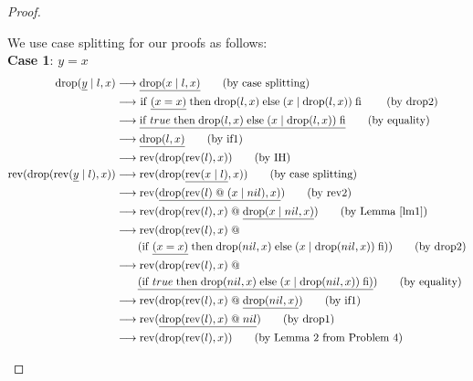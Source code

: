 \documentclass[12pt, a4paper]{article}
\newcommand{\rel}[1]{\mathrel{#1}}
\newcommand{\rmx}[1]{\mathrm{#1}}
\newcommand{\larrow}{\longrightarrow}
\newcommand{\under}{\underline}
\begin{document}
\begin{proof}
\begin{description}
We use case splitting for our proofs as follows:\\
\textbf{Case 1}: $y = x$
\begin{align*}
\rmx{drop}(\under{y} \rel{|} l, x)
	&\larrow \under{\rmx{drop}(x \rel{|} l, x)} \tag{by case splitting} \\
	&\larrow\ \rel{\rmx{if}} \under{(x = x)} \rel{\rmx{then}} \rmx{drop}(l, x) \rel{\rmx{else}} (x \rel{|} \rmx{drop}(l, x)) \rel{\rmx{fi}} \tag{by drop2} \\
	&\larrow \under{\rel{\rmx{if}} true \rel{\rmx{then}} \rmx{drop}(l, x) \rel{\rmx{else}} (x \rel{|} \rmx{drop}(l, x)) \rel{\rmx{fi}}} \tag{by equality} \\
	&\larrow \under{\rmx{drop}(l, x)} \tag{by if1} \\
	&\larrow \rmx{rev}(\rmx{drop}(\rmx{rev}(l), x)) \tag{by IH} \\
\rmx{rev}(\rmx{drop}(\rmx{rev}(\under{y} \rel{|} l), x))
	&\larrow \rmx{rev}(\rmx{drop}(\under{\rmx{rev}(x \rel{|} l)}, x)) \tag{by case splitting} \\
	&\larrow \rmx{rev}(\under{\rmx{drop}(\rmx{rev}(l) \rel{@} (x \rel{|} nil), x)}) \tag{by rev2} \\
	&\larrow \rmx{rev}(\rmx{drop}(\rmx{rev}(l), x) \rel{@} \under{\rmx{drop}(x \rel{|} nil, x)}) \tag{by Lemma~\ref{lm1}} \\
	&\larrow \rmx{rev}(\rmx{drop}(\rmx{rev}(l), x) \rel{@} \\
	&\quad \quad (\rel{\rmx{if}} \under{(x = x)} \rel{\rmx{then}} \rmx{drop}(nil, x) \rel{\rmx{else}} (x \rel{|} \rmx{drop}(nil, x)) \rel{\rmx{fi}})) \tag{by drop2} \\
	&\larrow \rmx{rev}(\rmx{drop}(\rmx{rev}(l), x) \rel{@} \\
	&\quad \quad \under{(\rel{\rmx{if}} true \rel{\rmx{then}} \rmx{drop}(nil, x) \rel{\rmx{else}} (x \rel{|} \rmx{drop}(nil, x)) \rel{\rmx{fi}})}) \tag{by equality} \\
	&\larrow \rmx{rev}(\rmx{drop}(\rmx{rev}(l), x) \rel{@} \under{\rmx{drop}(nil, x)}) \tag{by if1} \\
	&\larrow \rmx{rev}(\under{\rmx{drop}(\rmx{rev}(l), x) \rel{@} nil}) \tag{by drop1} \\
	&\larrow \rmx{rev}(\rmx{drop}(\rmx{rev}(l), x)) \tag{by Lemma 2 from Problem 4}
\end{align*}


\end{description}
\end{proof}
\end{document}
